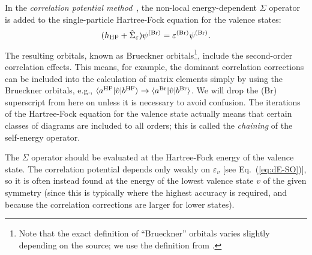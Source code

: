 \documentclass[10pt,twocolumn,a4paper]{article}%
\newcommand{\bra}[1]{\ensuremath{\langle #1|}}	%
\newcommand{\ket}[1]{\ensuremath{|#1\rangle}}	%
\newcommand{\be}{\begin{equation}}
\newcommand{\ee}{\end{equation}}
\def\en{\ensuremath{\varepsilon}}
\begin{document}
In the {\em correlation potential method}~\cite{DzubaPNC1984,DzubaPNC1985}, the non-local energy-dependent $\Sigma$ operator is added to the single-particle Hartree-Fock equation for the valence states:
\be\label{eq:H-Bru}
(h_{\rm HF} + \hat \Sigma_\en)\psi^{\rm (Br)} = \en^{\rm (Br)}\psi^{\rm (Br)}.
\ee
The resulting orbitals, known as Brueckner orbitals\footnote{Note that the exact definition of ``Brueckner'' orbitals varies slightly depending on the source; we use the definition from \cite{DzubaPNC1984}.}, include the second-order correlation effects.
This means, for example, the dominant correlation corrections can be included into the calculation of matrix elements simply by using the Brueckner orbitals, e.g., $\bra{a^{\rm HF}}{\hat v}\ket{b^{\rm HF}}\to\bra{a^{\rm Br}}{\hat v}\ket{b^{\rm Br}}$.
We will drop the (Br) superscript from here on unless it is necessary to avoid confusion.
The iterations of the Hartree-Fock equation for the valence state actually means that certain classes of diagrams are included to all orders; this is called the {\em chaining} of the self-energy operator.



The $\Sigma$ operator should be evaluated at the Hartree-Fock energy of the valence state.
The correlation potential depends only weakly on $\en_v$ [see Eq.~(\ref{eq:dE-SO})],
so it is often instead found at the energy of the lowest valence state $v$ of the given symmetry (since this is typically where the highest accuracy is required, and because the correlation corrections are larger for lower states).



\end{document}
